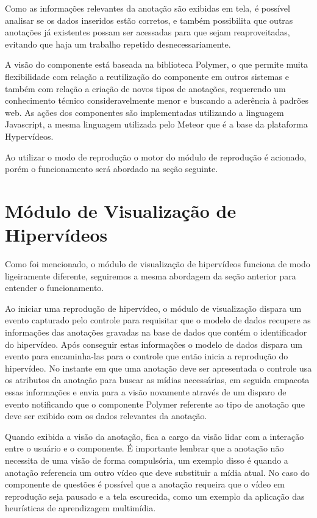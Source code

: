 Como as informações relevantes da anotação são exibidas em tela, é possível analisar se os dados inseridos estão corretos, e também possibilita que outras anotações já existentes possam ser acessadas para que sejam reaproveitadas, evitando que haja um trabalho repetido desnecessariamente.

A visão do componente está baseada na biblioteca Polymer, o que permite muita flexibilidade com relação a reutilização do componente em outros sistemas e também com relação a criação de novos tipos de anotações, requerendo um conhecimento técnico consideravelmente menor e buscando a aderência à padrões web. As ações dos componentes são implementadas utilizando a linguagem Javascript, a mesma linguagem utilizada pelo Meteor que é a base da plataforma Hypervídeos.

Ao utilizar o modo de reprodução o motor do módulo de reprodução é acionado, porém o funcionamento será abordado na seção seguinte.

\section{Módulo de Visualização de Hipervídeos}

Como foi mencionado, o módulo de visualização de hipervídeos funciona de modo ligeiramente diferente, seguiremos a mesma abordagem da seção anterior para entender o funcionamento.

Ao iniciar uma reprodução de hipervídeo, o módulo de visualização dispara um evento capturado pelo controle para requisitar que o modelo de dados recupere as informações das anotações gravadas na base de dados que contém o identificador do hipervídeo. Após conseguir estas informações o modelo de dados dispara um evento para encaminha-las para o controle que então inicia a reprodução do hipervídeo. No instante em que uma anotação deve ser apresentada o controle usa os atributos da anotação para buscar as mídias necessárias, em seguida empacota essas informações e envia para a visão novamente através de um disparo de evento notificando que o componente Polymer referente ao tipo de anotação que deve ser exibido com os dados relevantes da anotação.

Quando exibida a visão da anotação, fica a cargo da visão lidar com a interação entre o usuário e o componente. É importante lembrar que a anotação não necessita de uma visão de forma compulsória, um exemplo disso é quando a anotação referencia um outro vídeo que deve substituir a mídia atual. No caso do componente de questões é possível que a anotação requeira que o vídeo em reprodução seja pausado e a tela escurecida, como um exemplo da aplicação das heurísticas de aprendizagem multimídia.

